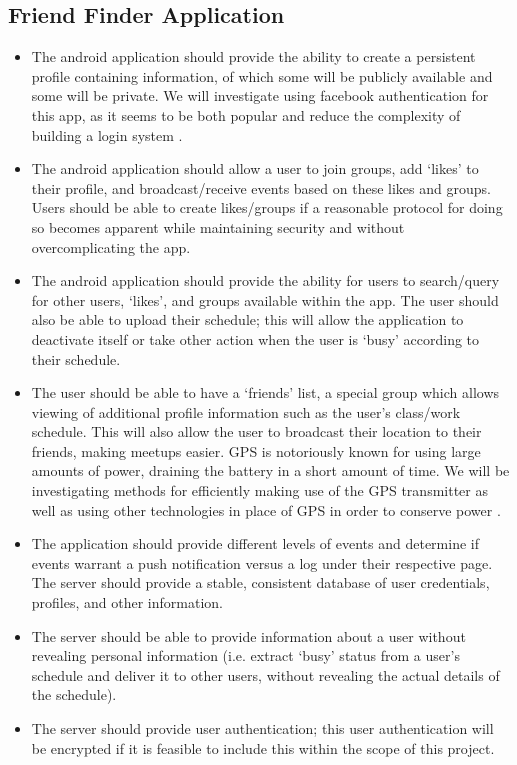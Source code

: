 \documentclass[11pt]{article}
\begin{document}
\subsection{Friend Finder Application}
\begin{itemize}
\item The android application should provide the ability to create a persistent 
profile containing information, of which some will be publicly available and some 
will be private. We will investigate using facebook authentication 
for this app, as it seems to be both popular and reduce the complexity of 
building a login system \cite{capstone_facebook}.

\item The android application should allow a user to join groups, add `likes' to 
their profile, and broadcast/receive events based on these likes and groups. 
Users should be able to create likes/groups if a reasonable protocol for doing
so becomes apparent while maintaining security and without overcomplicating
the app.

\item The android application should provide the ability for users to search/query 
for other users, `likes', and groups available within the app. The user should 
    also be able to upload their schedule; this will allow the application to 
    deactivate itself or take other action when the user is `busy' according to
    their schedule.

\item The user should be able to have a `friends' list, a special group which allows 
viewing of additional profile information such as the user's class/work 
schedule. This will also allow the user to broadcast their location to their 
friends, making meetups easier. GPS is notoriously known for using large amounts 
of power, draining the battery in a short amount of time. We will be investigating
methods for efficiently making use of the GPS transmitter as well as using 
other technologies in place of GPS in order to conserve power \cite{conserve_gps} \cite{gps_alternatives}.

\item The application should provide different levels of events and determine if 
events warrant a push notification versus a log under their respective page.
The server should provide a stable, consistent database of user credentials, 
profiles, and other information.

\item The server should be able to provide information about a user without revealing 
personal information (i.e. extract `busy' status from a user's schedule and 
deliver it to other users, 
without revealing the actual details of the schedule).

\item The server should provide user authentication; this user authentication will 
be encrypted if it is feasible to include this within the scope of this project.
\end{itemize}
\end{document}
